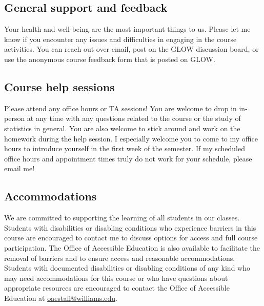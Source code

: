 \documentclass[11pt]{article}
\begin{document}
\subsection{General support and feedback}

Your health and well-being are the most important things to us. Please let me know if you encounter any issues and difficulties in engaging in the course activities. You can reach out over email, post on the GLOW discussion board, or use the anonymous course feedback form that is posted on GLOW. 

\subsection{Course help sessions}

Please attend any office hours or TA sessions! You are welcome to drop in in-person at any time with any questions related to the course or the study of statistics in general. You are also welcome to stick around and work on the homework during the help session. I especially welcome you to come to my office hours to introduce yourself in the first week of the semester. If my scheduled office hours and appointment times truly do not work for your schedule, please email me! 

\subsection{Accommodations}
We are committed to supporting the learning of all students in our classes. Students with disabilities or disabling conditions who experience barriers in this course are encouraged to
contact me to discuss options for access and full course participation. The Office of Accessible Education is also available to facilitate the removal of barriers and to ensure access and reasonable accommodations. Students with documented disabilities or disabling conditions of any kind who may need accommodations
for this course or who have questions about appropriate resources are encouraged to contact the Office of Accessible Education at \url{oaestaff@williams.edu}.
\end{document}
